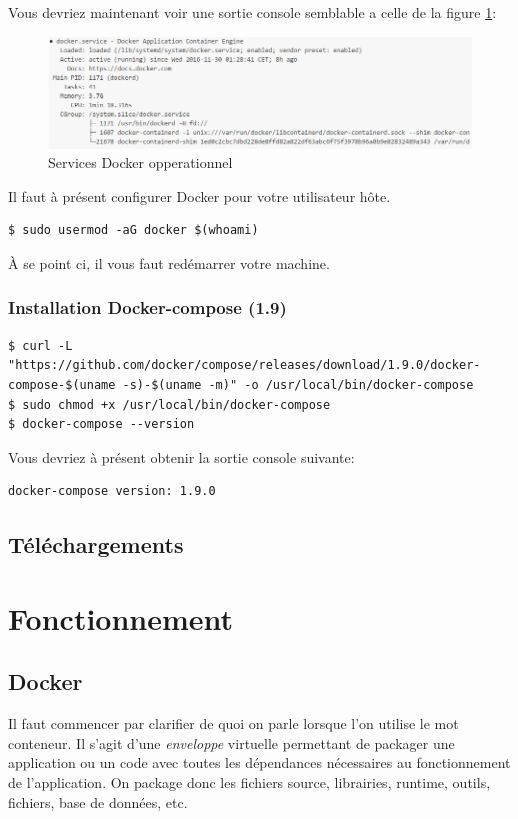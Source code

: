 Vous devriez maintenant voir une sortie console semblable a celle de la figure \ref{fig:dockerservices}:

\begin{figure}[H] 
\centering 
\includegraphics[width=1\columnwidth]{img/docker-services} 
\caption[docker services]{Services Docker opperationnel}
\label{fig:dockerservices} 
\end{figure}

Il faut à présent configurer Docker pour votre utilisateur hôte.

\begin{lstlisting}[frame=single]
$ sudo usermod -aG docker $(whoami)
\end{lstlisting}

À se point ci, il vous faut redémarrer votre machine.

\subsubsection{Installation Docker-compose (1.9)}

\begin{lstlisting}[frame=single]
$ curl -L "https://github.com/docker/compose/releases/download/1.9.0/docker-compose-$(uname -s)-$(uname -m)" -o /usr/local/bin/docker-compose
$ sudo chmod +x /usr/local/bin/docker-compose
$ docker-compose --version
\end{lstlisting}

Vous devriez à présent obtenir la sortie console suivante:
\begin{lstlisting}[frame=single]
docker-compose version: 1.9.0
\end{lstlisting}

\subsection{Téléchargements}

\section{Fonctionnement}
\subsection{Docker}
Il faut commencer par clarifier de quoi on parle lorsque l'on utilise le mot conteneur. Il s'agit d'une \emph{enveloppe} virtuelle permettant de packager une application ou un code avec toutes les dépendances nécessaires au fonctionnement de l'application. On package donc les fichiers source, librairies, runtime, outils, fichiers, base de données, etc. 

